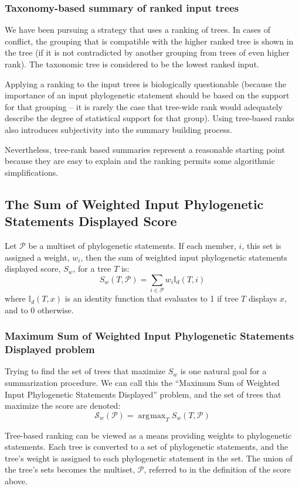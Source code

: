 \documentclass[11pt]{article}
\newcommand{\ps}{phylogenetic statement\xspace}
\newcommand{\pss}{phylogenetic statements\xspace}
\newcommand{\PSs}{Phylogenetic Statements\xspace}
\newcommand{\SWIPSD}{Sum of Weighted Input \PSs Displayed\xspace}
\newcommand{\MSWIPSD}{Maximum \SWIPSD \xspace}
\newcommand{\displaysPred}[2]{\ensuremath{\mathbb{I}_d(#1, #2)}}
\DeclareMathOperator*{\argmax}{\arg\!\max}
\begin{document}
\subsubsection{Taxonomy-based summary of ranked input trees}
We have been pursuing a strategy that uses a ranking of trees.
In cases of conflict, the grouping that is compatible with the 
    higher ranked tree is shown in the tree (if it is not contradicted by 
    another grouping from trees of even higher rank).
 The taxonomic tree is considered to be the lowest ranked input.

Applying a ranking to the input trees is biologically questionable (because
    the importance of an input \ps should be based on the support for that
    grouping -- it is rarely the case that tree-wide rank would adequately
    describe the degree of statistical support for that group).
Using tree-based ranks also introduces subjectivity into the summary building process.

Nevertheless, tree-rank based summaries represent a reasonable starting point
    because they are easy to explain and the ranking permits some algorithmic
    simplifications.

\subsection{The Sum of Weighted Input \PSs Displayed Score}
Let $\mathcal{P}$ be a multiset of \pss.
If each member, $i$, this set is assigned a weight, $w_i$, then the 
sum of weighted input \pss displayed score, $S_w$, for a tree $T$ is:
\begin{equation}
    S_w(T, \mathcal{P}) = \sum_{i\in \mathcal{P}} w_i \displaysPred{T}{i}
\end{equation}
where {\displaysPred{T}{x}} is an identity function that evaluates to 1 if tree $T$
        displays $x$, and to 0 otherwise.

\subsubsection{\MSWIPSD problem}
Trying to find the set of trees that maximize $S_w$ is one natural
    goal for a summarization procedure.
We can call this the ``\MSWIPSD''
problem,
    and the set of trees that maximize the score are denoted:
\begin{equation}
    \mathcal{S}_{w}(\mathcal{P}) = \argmax_T S_w(T,\mathcal{P}) 
\end{equation}

Tree-based ranking can be viewed as a means providing weights to \pss.
Each tree is converted to a set of \pss, and the tree's weight is 
    assigned to each \ps in the set.
The union of the tree's sets becomes the multiset, $\mathcal{P}$, referred to
    in the definition of the score above.
\end{document}
